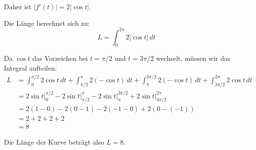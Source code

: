 \documentclass{article}
\begin{document}
Daher ist $|f'(t)| = 2|\cos t|$.

Die Länge berechnet sich zu:
$$L = \int_0^{2\pi} 2|\cos t| \, dt$$

Da $\cos t$ das Vorzeichen bei $t = \pi/2$ und $t = 3\pi/2$ wechselt, müssen wir das Integral aufteilen:
\begin{align}
L &= \int_0^{\pi/2} 2\cos t \, dt + \int_{\pi/2}^{\pi} 2(-\cos t) \, dt + \int_{\pi}^{3\pi/2} 2(-\cos t) \, dt + \int_{3\pi/2}^{2\pi} 2\cos t \, dt\\
&= 2\sin t \Big|_0^{\pi/2} - 2\sin t \Big|_{\pi/2}^{\pi} - 2\sin t \Big|_{\pi}^{3\pi/2} + 2\sin t \Big|_{3\pi/2}^{2\pi}\\
&= 2(1 - 0) - 2(0 - 1) - 2(-1 - 0) + 2(0 - (-1))\\
&= 2 + 2 + 2 + 2\\
&= 8
\end{align}

Die Länge der Kurve beträgt also $L = 8$.
\end{document}
